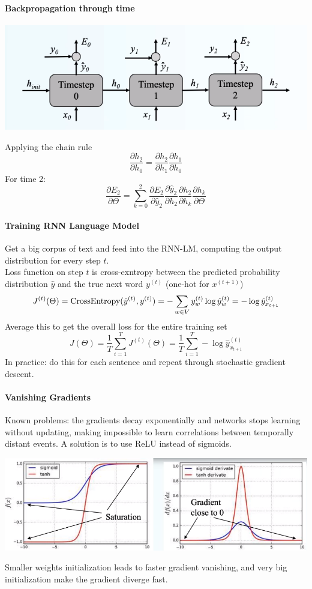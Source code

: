 \documentclass[10pt]{report}
\begin{document}
\paragraph{Backpropagation through time}
\begin{center}
	\includegraphics[scale=0.5]{27.png}
\end{center}
Applying the chain rule $$\frac{\partial h_2}{\partial h_0} = \frac{\partial h_2}{\partial h_1}\frac{\partial h_1}{\partial h_0}$$
For time 2:
$$\frac{\partial E_2}{\partial \Theta} = \sum_{k=0}^2\frac{\partial E_2}{\partial \hat{y}_2}\frac{\partial\hat{y}_2}{\partial h_2}\frac{\partial h_2}{\partial h_k}\frac{\partial h_k}{\partial\Theta}$$
\paragraph{Training RNN Language Model} Get a big corpus of text and feed into the RNN-LM, computing the output distribution for every step $t$.\\
Loss function on step $t$ is cross-exntropy between the predicted probability distribution $\hat{y}$ and the true next word $y^{(t)}$ (one-hot for $x^{(t+1)}$)
$$J^{(t)}(\Theta) = \hbox{CrossEntropy}(\hat{y}^{(t)}, y^{(t)}) = -\sum_{w\in V} y_w^{(t)}\log\hat{y}_w^{(t)} = -\log\hat{y}_{x_{t+1}}^{(t)}$$
Average this to get the overall loss for the entire training set
$$J(\Theta) = \frac{1}{T}\sum_{i=1}^T J^{(t)}(\Theta) = \frac{1}{T}\sum_{i=1}^T -\log\hat{y}_{x_{t+1}}^{(t)}$$
In practice: do this for each sentence and repeat through stochastic gradient descent.
\paragraph{Vanishing Gradients} Known problems: the gradients decay exponentially and networks stops learning without updating, making impossible to learn correlations between temporally distant events. A solution is to use ReLU instead of sigmoids.
\begin{center}
	\includegraphics[scale=0.5]{28.png}
\end{center}
Smaller weights initialization leads to faster gradient vanishing, and very big initialization make the gradient diverge fast.
\end{document}
